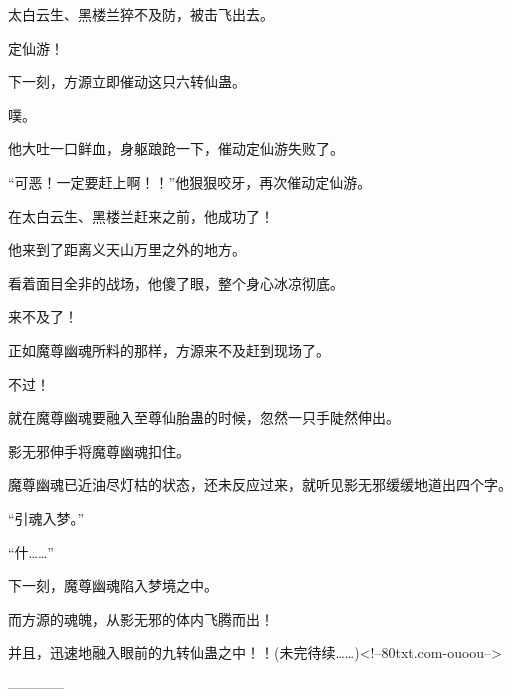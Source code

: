 \begin{this_body}
太白云生、黑楼兰猝不及防，被击飞出去。

定仙游！

下一刻，方源立即催动这只六转仙蛊。

噗。

他大吐一口鲜血，身躯踉跄一下，催动定仙游失败了。

“可恶！一定要赶上啊！！”他狠狠咬牙，再次催动定仙游。

在太白云生、黑楼兰赶来之前，他成功了！

他来到了距离义天山万里之外的地方。

看着面目全非的战场，他傻了眼，整个身心冰凉彻底。

来不及了！

正如魔尊幽魂所料的那样，方源来不及赶到现场了。

不过！

就在魔尊幽魂要融入至尊仙胎蛊的时候，忽然一只手陡然伸出。

影无邪伸手将魔尊幽魂扣住。

魔尊幽魂已近油尽灯枯的状态，还未反应过来，就听见影无邪缓缓地道出四个字。

“引魂入梦。”

“什……”

下一刻，魔尊幽魂陷入梦境之中。

而方源的魂魄，从影无邪的体内飞腾而出！

并且，迅速地融入眼前的九转仙蛊之中！！(未完待续……)<!--80txt.com-ouoou-->

------------

\end{this_body}

